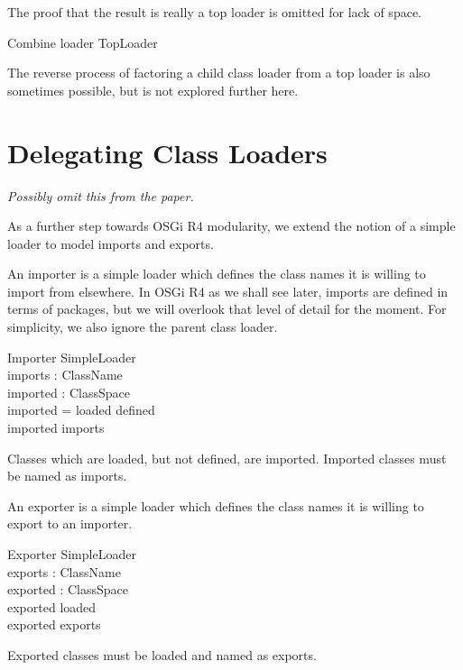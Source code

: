 \documentclass[a4paper,9pt]{article}
\begin{document}
The proof that the result is really a top loader is omitted for lack of space.
\begin{argue}
  Combine \vdash loader \in TopLoader
\end{argue}

The reverse process of factoring a child class loader from a top loader
is also sometimes possible, but is not explored further here.

\clearpage
\section{Delegating Class Loaders}
\label{cha:delegatingloaders}
\textit{Possibly omit this from the paper.}

As a further step towards OSGi R4 modularity, we extend the notion of
a simple loader to model imports and exports.

An importer is a simple loader which defines the class names it is willing
to import from elsewhere. In OSGi R4 as we shall see later, imports are
defined in terms of packages, but we will overlook that level of detail for
the moment. For simplicity, we also ignore the parent class loader.
\begin{schema}{Importer}
  SimpleLoader \\
  imports : \power ClassName \\
  imported : ClassSpace \\
\where
  imported = loaded \setminus defined \\
 \dom imported \subseteq imports \\
\end{schema}
Classes which are loaded, but not defined, are imported.
Imported classes must be named as imports.

An exporter is a simple loader which defines the class names it is willing
to export to an importer.
\begin{schema}{Exporter}
  SimpleLoader \\
  exports : \power ClassName \\
  exported : ClassSpace \\
\where
  exported \subseteq loaded \\
  \dom exported \subseteq exports \\
\end{schema}
Exported classes must be loaded and named as exports.
\end{document}
